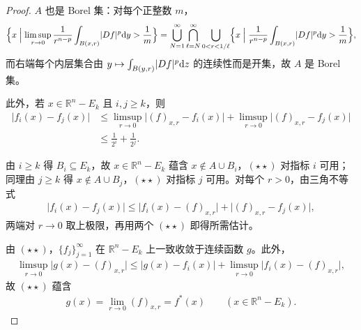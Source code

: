 \documentclass[../../main.tex]{subfiles}%
\begin{document}
\begin{proof}
$A$ 也是 Borel 集：对每个正整数 $m$，
\begin{align*}
\Bigl\{x\Bigm|\limsup_{r\to0}\frac{1}{r^{n-p}}\int_{B(x,r)}\lvert Df\rvert^p\mathrm{d} y>\frac1m\Bigr\}
=\bigcup_{N=1}^{\infty}\bigcap_{\ell=N}^{\infty}\bigcup_{0<r<1/\ell}\Bigl\{x\Bigm|\frac{1}{r^{n-p}}\int_{B(x,r)}\lvert Df\rvert^p\mathrm{d} y>\frac1m\Bigr\} ,
\end{align*}
而右端每个内层集合由 $y\mapsto\int_{B(y,r)}\lvert Df\rvert^p\mathrm{d} z$ 的连续性而是开集，故 $A$ 是 Borel 集。

此外，若 $x\in\mathbb{R}^n-E_k$ 且 $i,j\geqslant k$，则
\begin{align*}
\lvert f_i(x)-f_j(x)\rvert&\leqslant\limsup_{r\to0}\lvert(f)_{x,r}-f_i(x)\rvert+\limsup_{r\to0}\lvert(f)_{x,r}-f_j(x)\rvert\\
&\leqslant\frac{1}{2^i}+\frac{1}{2^j} .
\end{align*}

由 $i\geqslant k$ 得 $B_i\subseteq E_k$，故 $x\in\mathbb{R}^n-E_k$ 蕴含 $x\notin A\cup B_i$，$(\star\star)$ 对指标 $i$ 可用；同理由 $j\geqslant k$ 得 $x\notin A\cup B_j$，$(\star\star)$ 对指标 $j$ 可用。对每个 $r>0$，由三角不等式
\begin{align*}
\lvert f_i(x)-f_j(x)\rvert\leqslant\lvert f_i(x)-(f)_{x,r}\rvert+\lvert(f)_{x,r}-f_j(x)\rvert ,
\end{align*}
两端对 $r\to0$ 取上极限，再用两个 $(\star\star)$ 即得所需估计。

由 $(\star\star)$，$\{f_j\}_{j=1}^{\infty}$ 在 $\mathbb{R}^n-E_k$ 上一致收敛于连续函数 $g$。此外，
\begin{align*}
\limsup_{r\to0}\lvert g(x)-(f)_{x,r}\rvert\leqslant\lvert g(x)-f_i(x)\rvert+\limsup_{r\to0}\lvert f_i(x)-(f)_{x,r}\rvert ,
\end{align*}
故 $(\star\star)$ 蕴含
\begin{align*}
g(x)=\lim_{r\to0}(f)_{x,r}=f^*(x)\qquad(x\in\mathbb{R}^n-E_k).
\end{align*}


\end{proof}
\end{document}
